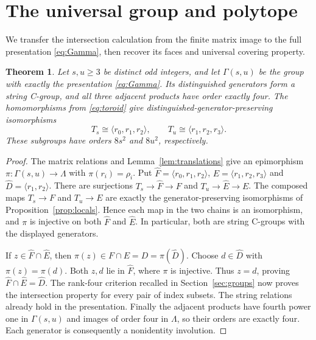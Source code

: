 \documentclass[11pt]{article}
\newtheorem{theorem}{Theorem}[section]
\theoremstyle{definition}
\newcommand{\ang}[1]{\langle #1\rangle}
\begin{document}
\section{The universal group and polytope}\label{sec:universal}
We transfer the intersection calculation from the finite matrix image
to the full presentation \eqref{eq:Gamma}, then recover its faces and
universal covering property.

\begin{theorem}\label{thm:group}
Let $s,u\geq3$ be distinct odd integers, and let $\Gamma(s,u)$ be the
group with exactly the presentation \eqref{eq:Gamma}.
Its distinguished generators form a string C-group, and all three
adjacent products have order exactly four. The homomorphisms from
\eqref{eq:toroid} give distinguished-generator-preserving isomorphisms
\[
 T_s\cong\ang{r_0,r_1,r_2},\qquad
 T_u\cong\ang{r_1,r_2,r_3}.
\]
These subgroups have orders $8s^2$ and $8u^2$, respectively.
\end{theorem}
\begin{proof}
The matrix relations and Lemma~\ref{lem:translations} give an epimorphism
$\pi:\Gamma(s,u)\to\Lambda$ with $\pi(r_i)=\rho_i$.
Put $\widehat F=\ang{r_0,r_1,r_2}$,
$\widehat E=\ang{r_1,r_2,r_3}$ and $\widehat D=\ang{r_1,r_2}$.
There are surjections $T_s\to\widehat F\to F$ and
$T_u\to\widehat E\to E$. The composed maps $T_s\to F$ and $T_u\to E$ are exactly the
generator-preserving isomorphisms of Proposition~\ref{prop:locals}.
Hence each map in the two chains is an isomorphism,
and $\pi$ is injective on both $\widehat F$ and $\widehat E$.
In particular, both are string C-groups with the displayed generators.

If $z\in\widehat F\cap\widehat E$, then
$\pi(z)\in F\cap E=D=\pi(\widehat D)$.
Choose $d\in\widehat D$ with $\pi(z)=\pi(d)$.
Both $z,d$ lie in $\widehat F$, where $\pi$ is injective. Thus $z=d$,
proving $\widehat F\cap\widehat E=\widehat D$.
The rank-four criterion recalled in Section~\ref{sec:groups} now
proves the intersection property for every pair of index subsets.
The string relations already hold in the presentation.
Finally the adjacent products have fourth power one in $\Gamma(s,u)$
and images of order four in $\Lambda$, so their orders are exactly four.
Each generator is consequently a nonidentity involution.
\end{proof}
\end{document}
